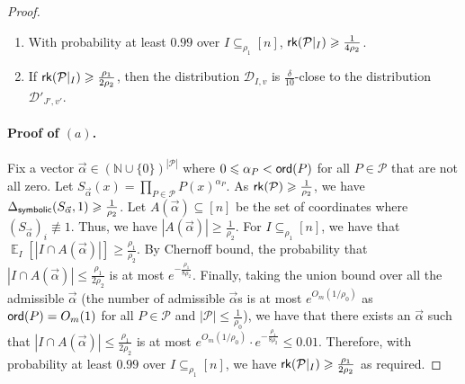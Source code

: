 \documentclass[11pt]{article}
\newcommand\Expect[2]{{\mathop{\mathbb{E}}_{#1}\left[ {#2} \right]}}
\renewcommand\geq{\geqslant}
\renewcommand\leq{\leqslant}
\begin{document}
\begin{proof}
\begin{enumerate}
    \item[(a)] With probability at least $0.99$ over $I\subseteq_{\rho_1} [n]$, ${\sf rk}(\mathcal{P}|_{I})\geq \frac{1}{4\rho_2}$.
    \item[(b)] If ${\sf rk}(\mathcal{P}|_{{I}})\geq \frac{\rho_1}{2\rho_2}$, then the distribution $\mathcal{D}_{I, v}$ is $\frac{\delta}{10}$-close to the distribution $\mathcal{D}'_{J', v'}$.
\end{enumerate}

\paragraph{Proof of $(a)$.} Fix a vector $\vec{\alpha}\in (\mathbb{N} \cup \{0\})^{|\mathcal{P}|}$ where $0\leq \alpha_P <{\sf ord}(P)$ for all $P\in \mathcal{P}$ that are not all zero. Let $S_{\vec{\alpha}}(x) = \prod_{P\in \mathcal{P}} P(x)^{\alpha_P}$. As ${\sf rk}(\mathcal{P}) \geq \frac{1}{\rho_2}$, we have $\Delta_{{\sf symbolic}}(S_{\vec{\alpha}},1)\geq \frac{1}{\rho_2}$. Let $A({\vec{\alpha}}) \subseteq [n]$ be the set of coordinates where $(S_{\vec{\alpha}})_i \not\equiv 1$. Thus, we have $|A({\vec{\alpha}})|\geq \frac{1}{\rho_2}$. For $I\subseteq_{\rho_1} [n]$, we have that $	\Expect{I}{|I\cap A({\vec{\alpha}})|} \geq \frac{\rho_1}{\rho_2}$. By Chernoff bound, the probability that $|I\cap A({\vec{\alpha}})| \leq \frac{\rho_1}{2\rho_2}$ is at most $e^{-\frac{\rho_1}{8\rho_2}}$. Finally, taking the union bound over all the admissible $\vec{\alpha}$ (the number of admissible $\vec{\alpha}$s is at most $e^{O_m(1/\rho_0)}$ as ${\sf ord}(P) = O_m(1)$ for all $P\in \mathcal{P}$ and $|\mathcal{P}|\leq \frac{1}{\rho_0}$), we have that there exists an $\vec{\alpha}$ such that $|I\cap A({\vec{\alpha}})| \leq \frac{\rho_1}{2\rho_2}$ is at most \hypertarget{setting1}{$e^{O_m(1/\rho_0)}\cdot e^{-\frac{\rho_1}{8\rho_2}}\leq 0.01$}. Therefore, with probability at least $0.99$ over $I\subseteq_{\rho_1} [n]$, we have ${\sf rk}(\mathcal{P}|_{I})\geq \frac{\rho_1}{2\rho_2}$ as required.

\end{proof}
\end{document}
